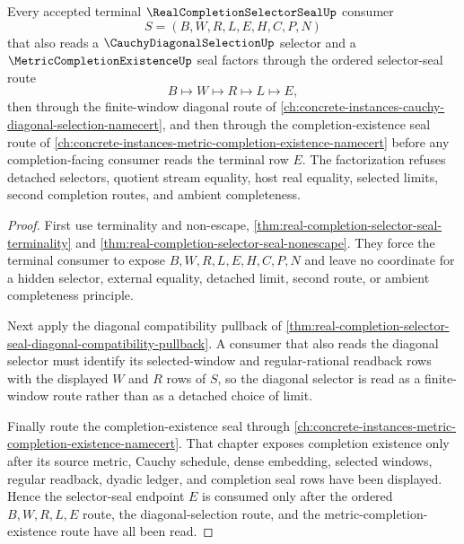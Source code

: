\begin{theorem}
\label{thm:real-completion-selector-seal-cauchy-diagonal-metric-completion-factorization}
Every accepted terminal $\RealCompletionSelectorSealUp$ consumer
$$
S=(B,W,R,L,E,H,C,P,N)
$$
that also reads a $\CauchyDiagonalSelectionUp$ selector and a $\MetricCompletionExistenceUp$ seal factors through the ordered selector-seal route
$$
B \longmapsto W \longmapsto R \longmapsto L \longmapsto E,
$$
then through the finite-window diagonal route of \autoref{ch:concrete-instances-cauchy-diagonal-selection-namecert}, and then through the completion-existence seal route of \autoref{ch:concrete-instances-metric-completion-existence-namecert} before any completion-facing consumer reads the terminal row $E$. The factorization refuses detached selectors, quotient stream equality, host real equality, selected limits, second completion routes, and ambient completeness.
\end{theorem}
\begin{proof}
First use terminality and non-escape, \autoref{thm:real-completion-selector-seal-terminality} and \autoref{thm:real-completion-selector-seal-nonescape}. They force the terminal consumer to expose $B,W,R,L,E,H,C,P,N$ and leave no coordinate for a hidden selector, external equality, detached limit, second route, or ambient completeness principle.

Next apply the diagonal compatibility pullback of \autoref{thm:real-completion-selector-seal-diagonal-compatibility-pullback}. A consumer that also reads the diagonal selector must identify its selected-window and regular-rational readback rows with the displayed $W$ and $R$ rows of $S$, so the diagonal selector is read as a finite-window route rather than as a detached choice of limit.

Finally route the completion-existence seal through \autoref{ch:concrete-instances-metric-completion-existence-namecert}. That chapter exposes completion existence only after its source metric, Cauchy schedule, dense embedding, selected windows, regular readback, dyadic ledger, and completion seal rows have been displayed. Hence the selector-seal endpoint $E$ is consumed only after the ordered $B,W,R,L,E$ route, the diagonal-selection route, and the metric-completion-existence route have all been read.
\end{proof}


